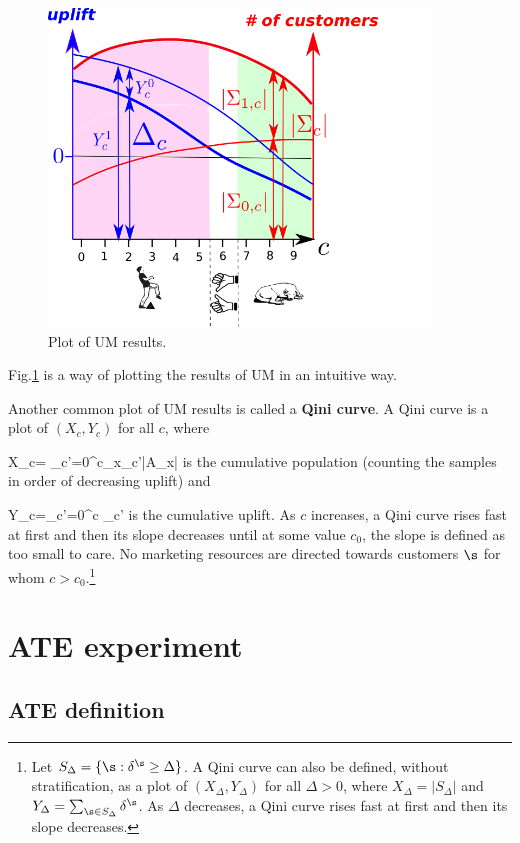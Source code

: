 \begin{figure}[h!]
\centering
\includegraphics[width=4in]
{uplift/qini-fake-up.png}

\caption{
Plot
of UM results.
} 
\label{fig-qini-fake}
\end{figure}
Fig.\ref{fig-qini-fake}
is a  way of
plotting
the results 
of UM in an
intuitive
way.


Another common plot of UM results is
called a {\bf Qini
curve}.
A Qini curve is a plot 
of $(X_c,Y_c)$
for all $c$, where

\beq
X_c= \sum_{c'=0}^{c}\sum_{x\in \calx_{c'}}|A_x|
\eeq
is the cumulative population (counting the
samples in
order of decreasing uplift) and

\beq
Y_c=\sum_{c'=0}^c \Delta_{c'}
\eeq
is the cumulative uplift.
As $c$ increases, a Qini curve rises fast at first and then its slope decreases until
at some value $c_0$, the slope is defined as too small to care. No marketing resources are
directed towards
customers $\s$ for whom  $c>c_0$.\footnote{
Let 
$S_{\Delta} = \{\s:\delta^\s \geq \Delta\}$.
A Qini curve can also be defined, without stratification,
as a
 plot of $(X_\Delta, Y_\Delta)$ for all $\Delta>0$,
where $
X_\Delta = |S_{\Delta}|$
and
$
Y_\Delta= \sum_{\s\in S_{\Delta}}\delta^\s
$. As $\Delta$ decreases, a Qini curve rises fast at first and then its slope decreases.
}

\section{ATE experiment}
\subsection{ATE definition}

